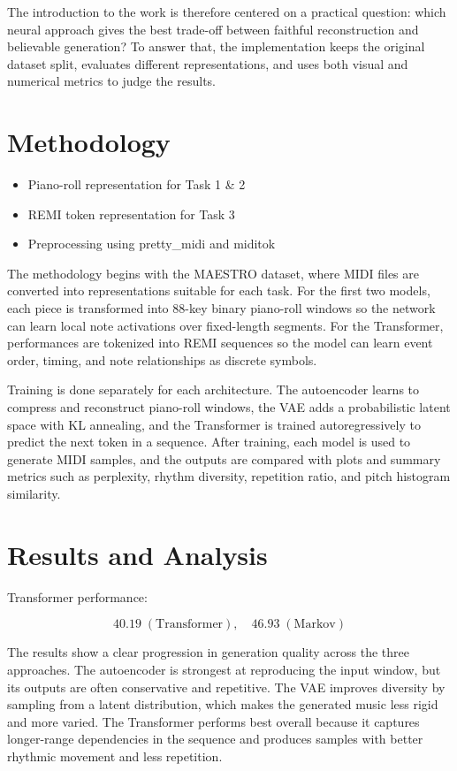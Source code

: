 \documentclass{article}
\begin{document}
The introduction to the work is therefore centered on a practical question: which neural approach gives the best trade-off between faithful reconstruction and believable generation? To answer that, the implementation keeps the original dataset split, evaluates different representations, and uses both visual and numerical metrics to judge the results.

\section{Methodology}

\begin{itemize}
    \item Piano-roll representation for Task 1 \& 2
    \item REMI token representation for Task 3
    \item Preprocessing using pretty_midi and miditok
\end{itemize}

The methodology begins with the MAESTRO dataset, where MIDI files are converted into representations suitable for each task. For the first two models, each piece is transformed into 88-key binary piano-roll windows so the network can learn local note activations over fixed-length segments. For the Transformer, performances are tokenized into REMI sequences so the model can learn event order, timing, and note relationships as discrete symbols.

Training is done separately for each architecture. The autoencoder learns to compress and reconstruct piano-roll windows, the VAE adds a probabilistic latent space with KL annealing, and the Transformer is trained autoregressively to predict the next token in a sequence. After training, each model is used to generate MIDI samples, and the outputs are compared with plots and summary metrics such as perplexity, rhythm diversity, repetition ratio, and pitch histogram similarity.

\section{Results and Analysis}

Transformer performance:

\[
40.19 \; (\text{Transformer}), \quad 46.93 \; (\text{Markov})
\]

The results show a clear progression in generation quality across the three approaches. The autoencoder is strongest at reproducing the input window, but its outputs are often conservative and repetitive. The VAE improves diversity by sampling from a latent distribution, which makes the generated music less rigid and more varied. The Transformer performs best overall because it captures longer-range dependencies in the sequence and produces samples with better rhythmic movement and less repetition.
\end{document}
